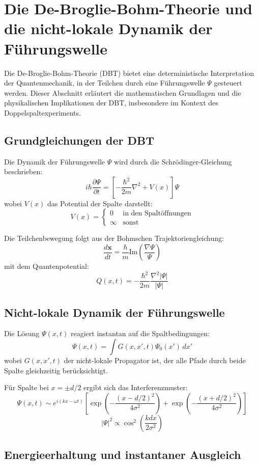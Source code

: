 \section{Die De-Broglie-Bohm-Theorie und die nicht-lokale Dynamik der Führungswelle}

Die De-Broglie-Bohm-Theorie (DBT) bietet eine deterministische Interpretation der Quantenmechanik, in der Teilchen durch eine Führungswelle $\Psi$ gesteuert werden. Dieser Abschnitt erläutert die mathematischen Grundlagen und die physikalischen Implikationen der DBT, insbesondere im Kontext des Doppelspaltexperiments.

\subsection{Grundgleichungen der DBT}

Die Dynamik der Führungswelle $\Psi$ wird durch die Schrödinger-Gleichung beschrieben:
\[ i\hbar\frac{\partial\Psi}{\partial t} = \left[-\frac{\hbar^2}{2m}\nabla^2 + V(x)\right]\Psi \]
wobei $V(x)$ das Potential der Spalte darstellt:
\[ V(x) = \begin{cases} 
0 & \text{in den Spaltöffnungen} \\
\infty & \text{sonst}
\end{cases} \]

Die Teilchenbewegung folgt aus der Bohmschen Trajektoriengleichung:
\[ \frac{d\mathbf{x}}{dt} = \frac{\hbar}{m}\text{Im}\left(\frac{\nabla\Psi}{\Psi}\right) \]
mit dem Quantenpotential:
\[ Q(x,t) = -\frac{\hbar^2}{2m}\frac{\nabla^2|\Psi|}{|\Psi|} \]

\subsection{Nicht-lokale Dynamik der Führungswelle}

Die Lösung $\Psi(x,t)$ reagiert instantan auf die Spaltbedingungen:
\[ \Psi(x,t) = \int G(x,x',t)\Psi_0(x')\,dx' \]
wobei $G(x,x',t)$ der nicht-lokale Propagator ist, der alle Pfade durch beide Spalte gleichzeitig berücksichtigt.

Für Spalte bei $x = \pm d/2$ ergibt sich das Interferenzmuster:
\[ \Psi(x,t) \sim e^{i(kx-\omega t)}\left[\exp\left(-\frac{(x-d/2)^2}{4\sigma^2}\right) + \exp\left(-\frac{(x+d/2)^2}{4\sigma^2}\right)\right] \]
\[ |\Psi|^2 \propto \cos^2\left(\frac{kdx}{2\sigma^2}\right) \]

\subsection{Energieerhaltung und instantaner Ausgleich}

